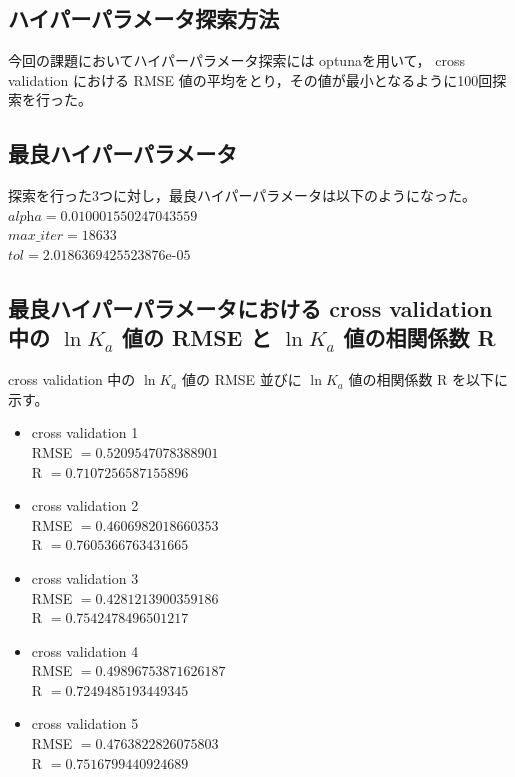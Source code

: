 \documentclass[a4j,11pt]{jarticle}
\begin{document}
\subsection{ハイパーパラメータ探索方法}
今回の課題においてハイパーパラメータ探索には optuna\cite{optuna}を用いて， cross validation における RMSE 値の平均をとり，その値が最小となるように100回探索を行った。 
\subsection{最良ハイパーパラメータ}
探索を行った3つに対し，最良ハイパーパラメータは以下のようになった。\\
\linebreak
$\textit{alpha} = 0.010001550247043559$\\
$\textit{max\_iter} = 18633$\\
$\textit{tol} = 2.0186369425523876$e-$05$\\
\subsection{最良ハイパーパラメータにおける cross validation 中の $\ln{K_a}$ 値の RMSE と $\ln{K_a}$ 値の相関係数 R}
 cross validation 中の $\ln{K_a}$ 値の RMSE 並びに $\ln{K_a}$ 値の相関係数 R を以下に示す。\\
\begin{itemize}
\item  cross validation 1\\
RMSE $= 0.5209547078388901$\\
R $= 0.7107256587155896$ \\
\item  cross validation 2\\
RMSE $= 0.4606982018660353$\\
R $= 0.7605366763431665$ \\
\item  cross validation 3\\
RMSE $= 0.4281213900359186$\\
R $= 0.7542478496501217$ \\
\item  cross validation 4\\
RMSE $= 0.49896753871626187$\\
R $= 0.7249485193449345$ \\
\item  cross validation 5\\
RMSE $= 0.4763822826075803$\\
R $= 0.7516799440924689$ \\
\end{itemize}
\end{document}
